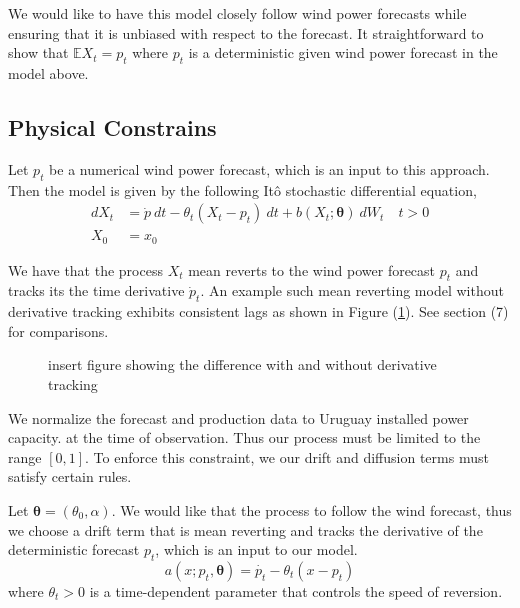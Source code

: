 \documentclass[10pt,twocolumn,letterpaper]{article}
\newcommand{\E}{\mathbb{E}}
\begin{document}
We would like to have this model closely follow wind power forecasts while ensuring that it is unbiased with respect to the forecast. It straightforward to show that $\E X_t = p_t$ where $p_t$ is a deterministic given wind power forecast in the model above.

\subsection{Physical Constrains}

Let $p_t$ be a numerical wind power forecast, which is an input to this approach. Then the model is given by the following It\^{o} stochastic differential equation,
\begin{equation}
\begin{split}
dX_t&= \dot{p} \ dt - \theta_t(X_t - p_t) \ dt + b (X_t; \bm{\theta} ) \ dW_t \quad t > 0 \\
X_0&=x_0
\end{split}
\label{model:derivative_tracking_X}
\end{equation}

We have that the process $X_t$ mean reverts to the wind power forecast $p_t$ and tracks its the time derivative $\dot{p}_t$.  An example such mean reverting model without derivative tracking exhibits consistent lags as shown in Figure (\ref{fig:derivative_tracking}). See section (7) for comparisons.

\begin{figure}
  \caption{insert figure showing the difference with and without derivative tracking}
  \label{fig:derivative_tracking}
\end{figure}



 We normalize the forecast and production data to Uruguay  installed power capacity. at the time of observation. Thus our process must be limited to the range $[0,1]$. To enforce this constraint, we our  drift and diffusion terms  must satisfy certain rules.
 

Let $\bm{\theta} = (\theta_0,\alpha)$. We would like that the process to follow the wind forecast, thus we choose a drift term that is mean reverting and tracks the derivative of the deterministic forecast $p_t$, which is an input to our model.
  \begin{equation}
    a(x; p_t,\bm{\theta})=  \dot{p_t} - \theta_t(x - p_t)
  \end{equation}
where $\theta_t>0$ is a time-dependent parameter that controls the speed of reversion.
\end{document}
